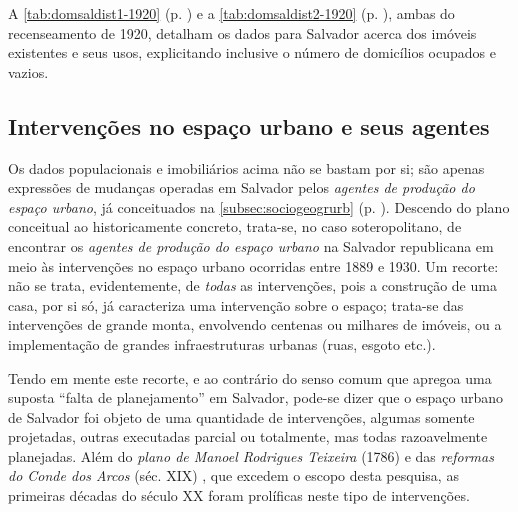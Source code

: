 A \autoref{tab:domsaldist1-1920} (p. \pageref{tab:domsaldist1-1920}) e a \autoref{tab:domsaldist2-1920} (p. \pageref{tab:domsaldist2-1920}), ambas do recenseamento de 1920, detalham os dados para Salvador acerca dos imóveis existentes e seus usos, explicitando inclusive o número de domicílios ocupados e vazios.




\subsection{Intervenções no espaço urbano e seus agentes}\label{subsec:1.4.3}

Os dados populacionais e imobiliários acima não se bastam por si; são apenas expressões de mudanças operadas em Salvador pelos \textit{agentes de produção do espaço urbano}, já conceituados na \autoref{subsec:sociogeogrurb} (p. \pageref{subsec:sociogeogrurb}). Descendo do plano conceitual ao historicamente concreto, trata-se, no caso soteropolitano, de encontrar os \textit{agentes de produção do espaço urbano} na Salvador republicana em meio às intervenções no espaço urbano ocorridas entre 1889 e 1930. Um recorte: não se trata, evidentemente, de \textit{todas} as intervenções, pois a construção de uma casa, por si só, já caracteriza uma intervenção sobre o espaço; trata-se das intervenções de grande monta, envolvendo centenas ou milhares de imóveis, ou a implementação de grandes infraestruturas urbanas (ruas, esgoto etc.).

Tendo em mente este recorte, e ao contrário do senso comum que apregoa uma suposta ``falta de planejamento'' em Salvador, pode-se dizer que o espaço urbano de Salvador foi objeto de uma quantidade de intervenções, algumas somente projetadas, outras executadas parcial ou totalmente, mas todas razoavelmente planejadas. Além do \textit{plano de Manoel Rodrigues Teixeira} (1786) \cite[p.~318]{ruy_politica_1949} e das \textit{reformas do Conde dos Arcos} (séc. XIX) \cite{sampaio_formas_1999,VASCONCELOS2002}, que excedem o escopo desta pesquisa, as primeiras décadas do século XX foram prolíficas neste tipo de intervenções.

